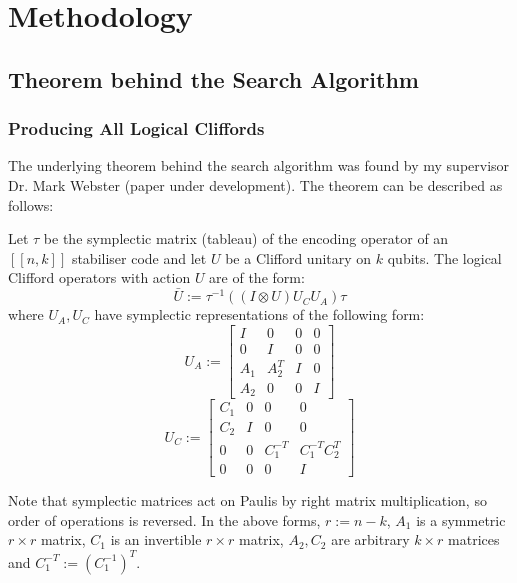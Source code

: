 \chapter{Methodology} \label{Chap3}

\section{Theorem behind the Search Algorithm}

\subsection{Producing All Logical Cliffords}
The underlying theorem behind the search algorithm was found by my supervisor Dr. Mark Webster (paper under development). The theorem can be described as follows:

\begin{theorem}
    Let \(\tau\) be the symplectic matrix (tableau) of the encoding operator of an \([[n,k]]\) stabiliser code and let $U$ be a Clifford unitary on \(k\) qubits. The logical Clifford operators with action \(U\) are of the form:
    \begin{equation}
    \label{eq:Generation of Logical operator}
        \bar{U}:=\tau^{-1}\left(\left( I\otimes U\right)U_C U_A\right)\tau
    \end{equation}
    where \(U_A, U_C\) have symplectic representations of the following form:
    \begin{equation}
        U_A := \left[\begin{array}{cc|cc}I&0&0&0\\0&I&0&0\\\hline A_1&A_2^T&I&0\\A_2&0&0&I\end{array}\right]
    \end{equation}
    \begin{equation}
        U_C := \left[\begin{array}{cc|cc}C_1&0&0&0\\C_2&I&0&0\\\hline 0&0&C_1^{-T}&C_1^{-T}C_2^T\\0&0&0&I\end{array}\right]
    \end{equation}
    
    Note that symplectic matrices act on Paulis by right matrix multiplication, so order of operations is reversed. In the above forms, \(r:=n-k\),  \(A_1\) is a symmetric \(r\times r\) matrix, \(C_1\) is an invertible \(r\times r\) matrix, \(A_2,C_2\) are arbitrary \(k\times r\) matrices and  \(C_1^{-T} := \left(C_1^{-1}\right)^T\).
\end{theorem}

